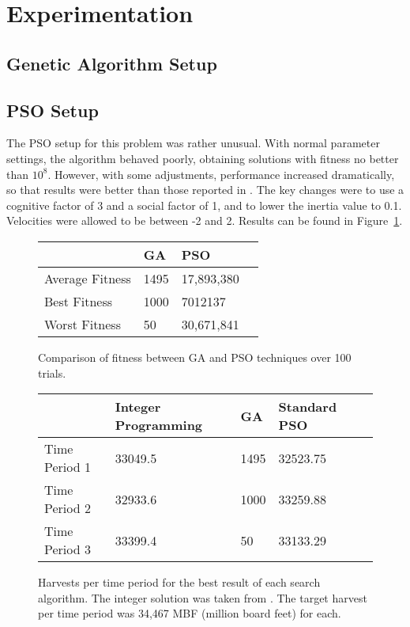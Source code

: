 \documentclass[12pt,fleqn]{article}
\begin{document}
\section{Experimentation}

\subsection{Genetic Algorithm Setup}

\subsection{PSO Setup}
The PSO setup for this problem was rather unusual.  With normal parameter settings,
the algorithm behaved poorly, obtaining solutions with fitness no better than
$10^8$.  However, with some adjustments, performance increased dramatically, so that
results were better than those reported in \cite{potter}.  The key changes
were to use a cognitive factor of 3 and a social factor of 1, and to lower the inertia value 
to 0.1.  Velocities were allowed to be between -2 and 2.  Results can be found in Figure~\ref{fig:results}.

\begin{figure}
\begin{centering}
\begin{tabular}{ | l | l | l | l |}
\hline
                & GA         & PSO     \\ \hline
Average Fitness & 1495       & 17,893,380     \\ \hline 
Best Fitness    & 1000       & 7012137    \\ \hline
Worst Fitness   & 50         & 30,671,841     \\ \hline
\end{tabular}
\caption{Comparison of fitness between GA and PSO techniques over 100 trials.}
\label{fig:results}
\end{centering}
\end{figure}

\begin{figure}
\begin{centering}
\begin{tabular}{ | l | l | l | l | l |}
\hline
                & Integer Programming &GA         & Standard PSO      \\ \hline
Time Period 1   & 33049.5             &1495       & 32523.75          \\ \hline 
Time Period 2   & 32933.6             &1000       & 33259.88          \\ \hline
Time Period 3   & 33399.4             &50         & 33133.29          \\ \hline
\end{tabular}
\caption{Harvests per time period for the best result of each search algorithm. The integer
solution was taken from \cite{bettinger}. The target harvest per time period was 34,467 MBF 
(million board feet) for each.}
\label{fig:harvests}
\end{centering}
\end{figure}
\end{document}
